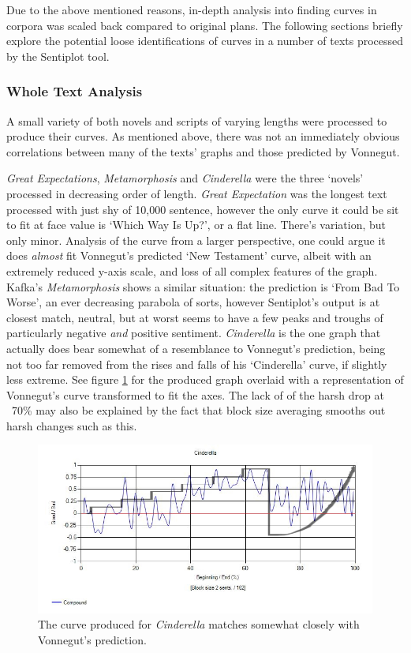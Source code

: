 \documentclass{article}
\begin{document}
        Due to the above mentioned reasons, in-depth analysis into finding curves in corpora was scaled back compared to original plans. The following sections briefly explore the potential loose identifications of curves in a number of texts processed by the Sentiplot tool.
        \subsubsection{Whole Text Analysis}
            A small variety of both novels and scripts of varying lengths were processed to produce their curves. As mentioned above, there was not an immediately obvious correlations between many of the texts' graphs and those predicted by Vonnegut. 
            
            \textit{Great Expectations}, \textit{Metamorphosis} and \textit{Cinderella} were the three `novels' processed in decreasing order of length. \textit{Great Expectation} was the longest text processed with just shy of 10,000 sentence, however the only curve it could be sit to fit at face value is `Which Way Is Up?', or a flat line. There's variation, but only minor. Analysis of the curve from a larger perspective, one could argue it does \textit{almost} fit Vonnegut's predicted `New Testament' curve, albeit with an extremely reduced y-axis scale, and loss of all complex features of the graph. Kafka's \textit{Metamorphosis} shows a similar situation: the prediction is `From Bad To Worse', an ever decreasing parabola of sorts, however Sentiplot's output is at closest match, neutral, but at worst seems to have a few peaks and troughs of particularly negative \textit{and} positive sentiment. \textit{Cinderella} is the one graph that actually does bear somewhat of a resemblance to Vonnegut's prediction, being not too far removed from the rises and falls of his `Cinderella' curve, if slightly less extreme. See figure \ref{fig:cinderellaComp} for the produced graph overlaid with a representation of Vonnegut's curve transformed to fit the axes. The lack of of the harsh drop at ~70\% may also be explained by the fact that block size averaging smooths out harsh changes such as this.
            \begin{figure}[hb]
                \includegraphics[width=1\textwidth]{Figures/Curve/CinderellaComp}
                \centering
                \caption{The curve produced for \textit{Cinderella} matches somewhat closely with Vonnegut's prediction.} 
                \label{fig:cinderellaComp}
            \end{figure}
\end{document}

